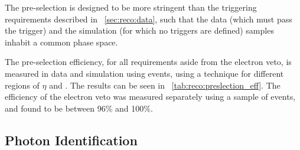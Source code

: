 The pre-selection is designed to be more stringent than the triggering requirements described in \Sec~\ref{sec:reco:data}, such that the data (which must pass the trigger) and the simulation (for which no triggers are defined) samples inhabit a common phase space.  

The pre-selection efficiency, for all requirements aside from the electron veto, is measured in data and simulation using \Zee events, using a \TagAndProbe technique for different regions of $\eta$ and \RNINE. The results can be seen in \Table~\ref{tab:reco:preslection_eff}. The efficiency of the electron veto was measured separately using a sample of \Zmmg events, and found to be between 96\% and 100\%.

\begin{table}[htbp]
\begin{small}
\begin{center}
\end{center} 
\end{small}
\caption{Photon pre-selection efficiency (using all requirements aside from the electron veto) measured using \Zee
events in data and simulation with a \TagAndProbe technique.}
\label{tab:reco:preslection_eff}
\end{table}

\subsection{Photon Identification}

